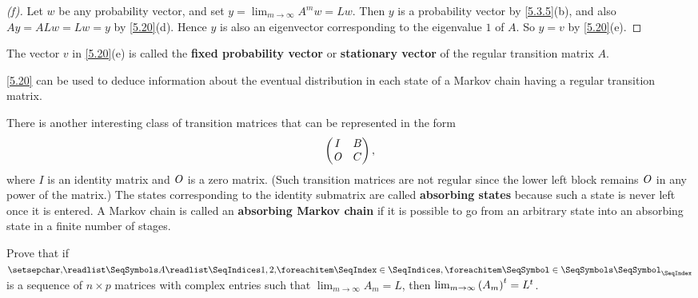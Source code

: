 \begin{proof}[(f)]
  Let \(w\) be any probability vector, and set \(y = \lim_{m \to \infty} A^m w = Lw\).
  Then \(y\) is a probability vector by \cref{5.3.5}(b), and also \(Ay = ALw = Lw = y\) by \cref{5.20}(d).
  Hence \(y\) is also an eigenvector corresponding to the eigenvalue \(1\) of \(A\).
  So \(y = v\) by \cref{5.20}(e).
\end{proof}

\begin{defn}\label{5.3.16}
  The vector \(v\) in \cref{5.20}(e) is called the \textbf{fixed probability vector} or \textbf{stationary vector} of the regular transition matrix \(A\).
\end{defn}

\begin{note}
  \cref{5.20} can be used to deduce information about the eventual distribution in each state of a Markov chain having a regular transition matrix.
\end{note}

\begin{defn}\label{5.3.17}
  There is another interesting class of transition matrices that can be represented in the form
  \[
    \begin{pmatrix}
      I   & B \\
      \mathit{O} & C
    \end{pmatrix},
  \]
  where \(I\) is an identity matrix and \(\mathit{O}\) is a zero matrix.
  (Such transition matrices are not regular since the lower left block remains \(\mathit{O}\) in any power of the matrix.)
  The states corresponding to the identity submatrix are called \textbf{absorbing states} because such a state is never left once it is entered.
  A Markov chain is called an \textbf{absorbing Markov chain} if it is possible to go from an arbitrary state into an absorbing state in a finite number of stages.
\end{defn}

\exercisesection

\setcounter{ex}{2}
\begin{ex}\label{ex:5.3.3}
  Prove that if \(\seq{A}{1,2,}\) is a sequence of \(n \times p\) matrices with complex entries such that \(\lim_{m \to \infty} A_m = L\), then \(\lim_{m \to \infty} {(A_m)}^{t} = {L}^{t}\).
\end{ex}

